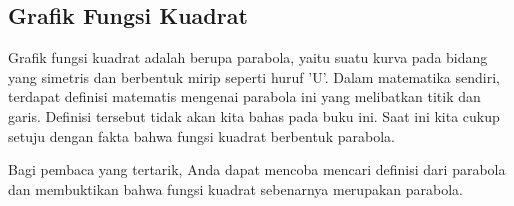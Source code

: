 \subsection{Grafik Fungsi Kuadrat}
	
	Grafik fungsi kuadrat adalah berupa parabola, yaitu suatu kurva pada bidang yang simetris dan berbentuk mirip seperti huruf 'U'. Dalam matematika sendiri, terdapat definisi matematis mengenai parabola ini yang melibatkan titik dan garis. Definisi tersebut tidak akan kita bahas pada buku ini. Saat ini kita cukup setuju dengan fakta bahwa fungsi kuadrat berbentuk parabola.
	
	\begin{explbox}
		Bagi pembaca yang tertarik, Anda dapat mencoba mencari definisi dari parabola dan membuktikan bahwa fungsi kuadrat sebenarnya merupakan parabola.
	\end{explbox}
	

